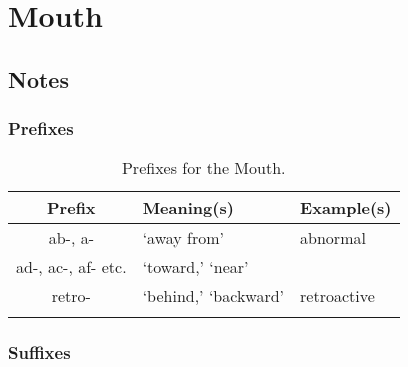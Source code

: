 %
%
%
\chapter{Mouth}
\label{Mouth} %








\abstract{}


\section{Notes}
\label{sec:NOTE8}


\subsection{Prefixes}

\begin{longtable}{c | p{} | p{}}
    \caption{Prefixes for the Mouth.}
    \hline
    Prefix & Meaning(s) & Example(s) \\ \hline
        ab-, a- & `away from' & abnormal \\
        ad-, ac-, af- etc. & `toward,' `near' & \\
        retro- & `behind,' `backward' & retroactive \\
    \label{tab:Ch8Prefix}
\end{longtable}



\subsection{Suffixes}

